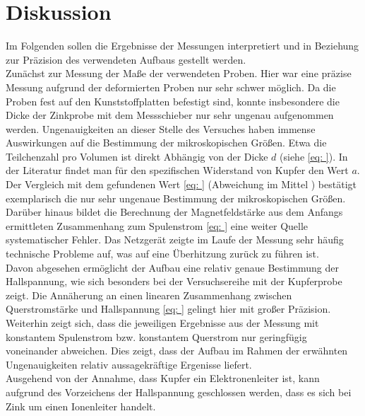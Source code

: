 \section{Diskussion}
Im Folgenden sollen die Ergebnisse der Messungen interpretiert und in Beziehung zur Präzision des verwendeten Aufbaus gestellt werden. \\
Zunächst zur Messung der Maße der verwendeten Proben. Hier war eine präzise Messung aufgrund der deformierten Proben nur sehr schwer möglich.
Da die Proben fest auf den Kunststoffplatten befestigt sind, konnte insbesondere die Dicke der Zinkprobe mit dem Messschieber nur sehr ungenau aufgenommen werden.
Ungenauigkeiten an dieser Stelle des Versuches haben immense Auswirkungen auf die Bestimmung der mikroskopischen Größen. Etwa die Teilchenzahl pro Volumen
ist direkt Abhängig von der Dicke $d$ (siehe \eqref{eq: }). In der Literatur \cite{} findet man für den spezifischen Widerstand von Kupfer den Wert $a$. Der Vergleich
mit dem gefundenen Wert \eqref{eq: } (Abweichung im Mittel ) bestätigt exemplarisch die nur sehr ungenaue Bestimmung der mikroskopischen Größen.
Darüber hinaus bildet die Berechnung der Magnetfeldstärke aus dem Anfangs ermittleten Zusammenhang zum Spulenstrom \eqref{eq: } eine weiter Quelle systematischer
Fehler. Das Netzgerät zeigte im Laufe der Messung sehr häufig technische Probleme auf, was auf eine Überhitzung zurück zu führen ist. \\
Davon abgesehen ermöglicht der Aufbau eine relativ genaue Bestimmung der Hallspannung, wie sich besonders bei der Versuchsereihe mit der Kupferprobe zeigt. Die Annäherung
an einen linearen Zusammenhang zwischen Querstromstärke und Hallspannung \eqref{eq: } gelingt hier mit großer Präzision. Weiterhin zeigt sich, dass die jeweiligen
Ergebnisse aus der Messung mit konstantem Spulenstrom bzw. konstantem Querstrom nur geringfügig voneinander abweichen. Dies zeigt, dass der Aufbau im Rahmen der erwähnten
Ungenauigkeiten relativ aussagekräftige Ergenisse liefert.\\
Ausgehend von der Annahme, dass Kupfer ein Elektronenleiter ist,
kann aufgrund des Vorzeichens der Hallspannung geschlossen werden, dass es sich bei Zink um einen Ionenleiter handelt. \\
